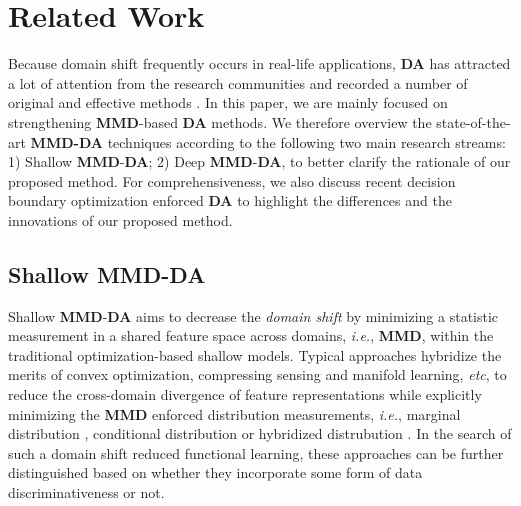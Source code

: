 \section{Related Work}
\label{Related Work}


Because domain shift frequently occurs in real-life applications,  \textbf{DA} has attracted a lot of attention from the research communities and recorded a number of original and  effective methods \cite{DBLP:journals/csur/LuLHWC20, 7078994, pan2010survey, luo2022attention}. In this paper, we are mainly focused  on strengthening  \textbf{MMD}-based \textbf{DA} methods. We therefore overview the state-of-the-art \textbf{MMD-DA} techniques according to  the following two main research streams: 1) Shallow \textbf{MMD}-\textbf{DA}; 2) Deep \textbf{MMD}-\textbf{DA}, to better clarify the rationale of our proposed method. For comprehensiveness, we also discuss recent decision boundary optimization enforced \textbf{DA} to highlight the differences and the innovations of our proposed method.







\subsection{Shallow \textbf{MMD}-\textbf{DA}}
\label{subsect: Shallow DA}


Shallow \textbf{MMD}-\textbf{DA} aims to decrease the  \textit{domain shift} by minimizing a statistic measurement in a shared feature space across domains, \textit{i.e.}, \textbf{MMD}, within the traditional optimization-based shallow models. Typical approaches \cite{luo2020discriminative, long2013transfer, wang2020transfer} hybridize the merits of convex optimization, compressing sensing and manifold learning, \textit{etc}, to reduce the cross-domain divergence of feature representations while explicitly minimizing the \textbf{MMD} enforced distribution measurements, \textit{i.e.}, marginal distribution \cite{4967588} \cite{pan2011domain}, conditional distribution \cite{long2013transfer} or hybridized distrubution \cite{wang2020transfer}. In the search of such a domain shift reduced functional learning, these approaches can be further distinguished based on whether they incorporate some form of data discriminativeness or not.




